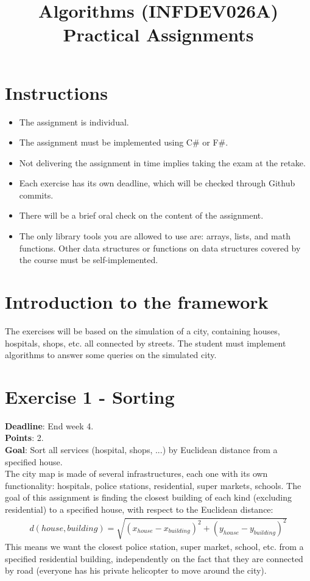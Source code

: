 \documentclass[10pt,a4paper]{article}
\title{Algorithms (INFDEV026A) \\ Practical Assignments}
\author { }
\date { }
\begin{document}
\maketitle

\section*{Instructions}
\begin{itemize}[noitemsep]
\item The assignment is individual.
\item The assignment must be implemented using C\# or F\#.
\item Not delivering the assignment in time implies taking the exam at the retake.
\item Each exercise has its own deadline, which will be checked through Github commits.
\item There will be a brief oral check on the content of the assignment.
\item The only library tools you are allowed to use are: arrays, lists, and math functions. Other data structures or functions on data structures covered by the course must be self-implemented.
\end{itemize}

\section*{Introduction to the framework}
The exercises will be based on the simulation of a city, containing houses, hospitals, shops, etc. all connected by streets. The student must implement algorithms to answer some queries on the simulated city.

\section*{Exercise 1 - Sorting}

\textbf{Deadline}: End week 4. \\
\textbf{Points}: 2. \\
\textbf{Goal}: Sort all services (hospital, shops, ...) by Euclidean distance from a specified house.\\

The city map is made of several infrastructures, each one with its own functionality: hospitals, police stations, residential, super markets, schools. The goal of this assignment is finding the closest building of each kind (excluding residential) to a specified house, with respect to the Euclidean distance:
\begin{align*}
d(house,building) = \sqrt{(x_{house} - x_{building})^{2} + (y_{house} - y_{building})^{2} } 
\end{align*}
\noindent
This means we want the closest police station, super market, school, etc. from a specified residential building, independently on the fact that they are connected by road (everyone has his private helicopter to move around the city).
\end{document}
